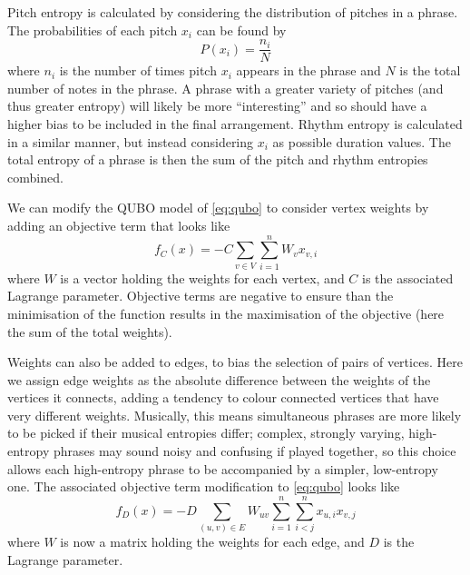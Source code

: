 \documentclass[12pt]{article}
\theoremstyle{definition}
\begin{document}
Pitch entropy is calculated by considering the distribution of pitches in a phrase. The probabilities of each pitch $x_i$ can be found by
\begin{equation}
    P(x_i)=\frac{n_i}{N}
    \label{eq:prob-dist}
\end{equation}
where $n_i$ is the number of times pitch $x_i$ appears in the phrase and $N$ is the total number of notes in the phrase. A phrase with a greater variety of pitches (and thus greater entropy) will likely be more ``interesting'' and so should have a higher bias to be included in the final arrangement.
Rhythm entropy is calculated in a similar manner, but instead considering $x_i$ as possible duration values.
The total entropy of a phrase is then the sum of the pitch and rhythm entropies combined.

We can modify the QUBO model of \cref{eq:qubo} to consider vertex weights by adding an objective term that looks like
\begin{equation}
    f_C(x)=-C\sum_{v\in V}\sum_{i=1}^n W_v x_{v,i}
\end{equation}
where $W$ is a vector holding the weights for each vertex, and $C$ is the associated Lagrange parameter. Objective terms are negative to ensure than the minimisation of the function results in the maximisation of the objective (here the sum of the total weights).

Weights can also be added to edges, to bias the selection of pairs of vertices. Here we assign edge weights as the absolute difference between the weights of the vertices it connects, adding a tendency to colour connected vertices that have very different weights. Musically, this means simultaneous phrases are more likely to be picked if their musical entropies differ; complex, strongly varying, high-entropy phrases may sound noisy and confusing if played together, so this choice allows each high-entropy phrase to be accompanied by a simpler, low-entropy one. The associated objective term modification to \cref{eq:qubo} looks like
\begin{equation}
    f_D(x)=-D\sum_{(u,v)\in E}W_{uv}\sum_{i=1}^n\sum_{i<j}^n x_{u,i}x_{v,j}
\end{equation}
where $W$ is now a matrix holding the weights for each edge, and $D$ is the Lagrange parameter.
\end{document}
